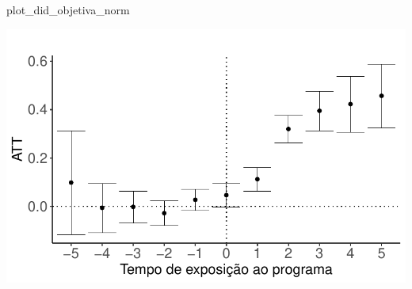 \documentclass[
  letterpaper,
  DIV=11,
  numbers=noendperiod]{scrartcl}
\newenvironment{Shaded}{\begin{snugshade}}{\end{snugshade}}
\newcommand{\NormalTok}[1]{\textcolor[rgb]{0.00,0.23,0.31}{#1}}
\begin{document}
\begin{Shaded}
\begin{Highlighting}[]
\NormalTok{plot\_did\_objetiva\_norm}
\end{Highlighting}
\end{Shaded}

\includegraphics{script_files/figure-latex/unnamed-chunk-22-6.pdf}
\end{document}
